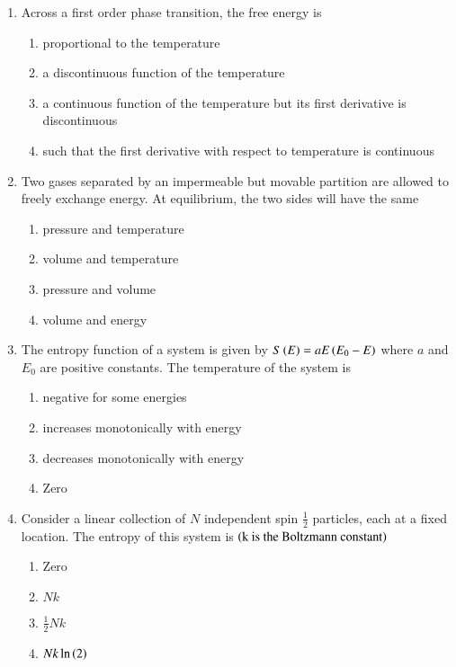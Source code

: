 \documentclass[journal,12pt,onecolumn]{IEEEtran}
\theoremstyle{remark}
\begin{document}
\begin{enumerate}
\item Across a first order phase transition, the free energy is
\hfill{}
\begin{enumerate}
\item proportional to the temperature
\item a discontinuous function of the temperature
\item a continuous function of the temperature but its first derivative is discontinuous
\item such that the first derivative with respect to temperature is continuous
\end{enumerate}

\item Two gases separated by an impermeable but movable partition are allowed to freely exchange energy. At equilibrium, the two sides will have the same
\hfill{}
\begin{enumerate}
\item pressure and temperature
\item volume and temperature
\item pressure and volume
\item volume and energy
\end{enumerate}

\item The entropy function of a system is given by $S\left(E\right) = aE\left(E_0 - E\right)$ where $a$ and $E_0$ are positive constants. The temperature of the system is
\hfill{}
\begin{enumerate}
\item negative for some energies 
\item increases monotonically with energy
\item decreases monotonically with energy
\item Zero
\end{enumerate}

\item Consider a linear collection of $N$ independent spin $\frac{1}{2}$ particles, each at a fixed location. The entropy of this system is $\left(\text{k is the Boltzmann constant}\right)$
\hfill{}
\begin{enumerate}
\item Zero
\item $Nk$
\item $\frac{1}{2}Nk$
\item $Nk\ln\left(2\right)$
\end{enumerate}


\end{enumerate}
\end{document}
